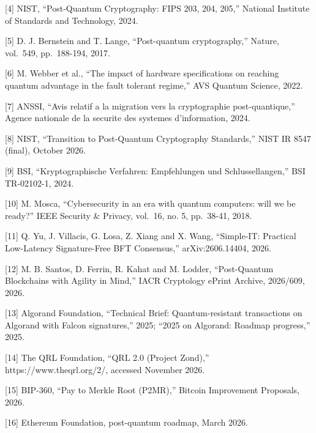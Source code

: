 \documentclass[
]{article}
\begin{document}
{[}4{]} NIST, ``Post-Quantum Cryptography: FIPS 203, 204, 205,''
National Institute of Standards and Technology, 2024.

{[}5{]} D. J. Bernstein and T. Lange, ``Post-quantum cryptography,''
Nature, vol.~549, pp.~188-194, 2017.

{[}6{]} M. Webber et al., ``The impact of hardware specifications on
reaching quantum advantage in the fault tolerant regime,'' AVS Quantum
Science, 2022.

{[}7{]} ANSSI, ``Avis relatif a la migration vers la cryptographie
post-quantique,'' Agence nationale de la securite des systemes
d'information, 2024.

{[}8{]} NIST, ``Transition to Post-Quantum Cryptography Standards,''
NIST IR 8547 (final), October 2026.

{[}9{]} BSI, ``Kryptographische Verfahren: Empfehlungen und
Schlussellangen,'' BSI TR-02102-1, 2024.

{[}10{]} M. Mosca, ``Cybersecurity in an era with quantum computers:
will we be ready?'' IEEE Security \& Privacy, vol.~16, no. 5, pp.~38-41,
2018.

{[}11{]} Q. Yu, J. Villacis, G. Losa, Z. Xiang and X. Wang, ``Simple-IT:
Practical Low-Latency Signature-Free BFT Consensus,'' arXiv:2606.14404,
2026.

{[}12{]} M. B. Santos, D. Ferrin, R. Kahat and M. Lodder, ``Post-Quantum
Blockchains with Agility in Mind,'' IACR Cryptology ePrint Archive,
2026/609, 2026.

{[}13{]} Algorand Foundation, ``Technical Brief: Quantum-resistant
transactions on Algorand with Falcon signatures,'' 2025; ``2025 on
Algorand: Roadmap progress,'' 2025.

{[}14{]} The QRL Foundation, ``QRL 2.0 (Project Zond),''
https://www.theqrl.org/2/, accessed November 2026.

{[}15{]} BIP-360, ``Pay to Merkle Root (P2MR),'' Bitcoin Improvement
Proposals, 2026.

{[}16{]} Ethereum Foundation, post-quantum roadmap, March 2026.
\end{document}
